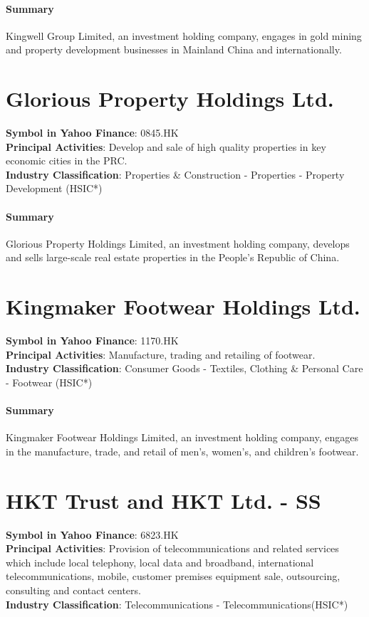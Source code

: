 \paragraph{Summary}
Kingwell Group Limited, an investment holding company, engages in gold mining and property development businesses in Mainland China and internationally.


\section{Glorious Property Holdings Ltd.}
\textbf{Symbol in Yahoo Finance}: 0845.HK\\
\textbf{Principal Activities}: Develop and sale of high quality properties in key economic cities in the PRC.\\
\textbf{Industry Classification}: Properties \& Construction - Properties - Property Development (HSIC*)
\paragraph{Summary}
Glorious Property Holdings Limited, an investment holding company, develops and sells large-scale real estate properties in the People's Republic of China.


\section{Kingmaker Footwear Holdings Ltd.}
\textbf{Symbol in Yahoo Finance}: 1170.HK\\
\textbf{Principal Activities}: Manufacture, trading and retailing of footwear.\\
\textbf{Industry Classification}: Consumer Goods - Textiles, Clothing \& Personal Care - Footwear (HSIC*)
\paragraph{Summary}
Kingmaker Footwear Holdings Limited, an investment holding company, engages in the manufacture, trade, and retail of men's, women's, and children's footwear.


\section{HKT Trust and HKT Ltd. - SS}
\textbf{Symbol in Yahoo Finance}: 6823.HK\\
\textbf{Principal Activities}: Provision of telecommunications and related services which include local telephony, local data and broadband, international telecommunications, mobile, customer premises equipment sale, outsourcing, consulting and contact centers.\\
\textbf{Industry Classification}: Telecommunications - Telecommunications(HSIC*)
